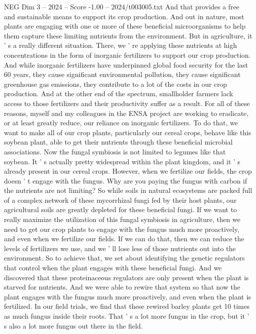 \begin{textsample}{NEG Dim 3 – 2024 – Score -1.00 – 2024/t003005.txt}
And that provides a free and sustainable means to support its crop production.
And out in nature, most plants are engaging with one or more of these beneficial microorganisms to help them capture these limiting nutrients from the environment.
But in agriculture, it ' s a really different situation.
There, we ' re applying these nutrients at high concentrations in the form of inorganic fertilizers to support our crop production.
And while inorganic fertilizers have underpinned global food security for the last 60 years, they cause significant environmental pollution, they cause significant greenhouse gas emissions, they contribute to a lot of the costs in our crop production.
And at the other end of the spectrum, smallholder farmers lack access to those fertilizers and their productivity suffer as a result.
For all of these reasons, myself and my colleagues in the ENSA project are working to eradicate, or at least greatly reduce, our reliance on inorganic fertilizers.
To do that, we want to make all of our crop plants, particularly our cereal crops, behave like this soybean plant, able to get their nutrients through these beneficial microbial associations.
Now the fungal symbiosis is not limited to legumes like that soybean.
It ' s actually pretty widespread within the plant kingdom, and it ' s already present in our cereal crops.
However, when we fertilize our fields, the crop doesn ' t engage with the fungus.
Why are you paying the fungus with carbon if the nutrients are not limiting?
So while soils in natural ecosystems are packed full of a complex network of these mycorrhizal fungi fed by their host plants, our agricultural soils are greatly depleted for these beneficial fungi.
If we want to really maximize the utilization of this fungal symbiosis in agriculture, then we need to get our crop plants to engage with the fungus much more proactively, and even when we fertilize our fields.
If we can do that, then we can reduce the levels of fertilizers we use, and we ' ll lose less of those nutrients out into the environment.
So to achieve that, we set about identifying the genetic regulators that control when the plant engages with these beneficial fungi.
And we discovered that these proteinaceous regulators are only present when the plant is starved for nutrients.
And we were able to rewire that system so that now the plant engages with the fungus much more proactively, and even when the plant is fertilized.
In our field trials, we find that these rewired barley plants get 10 times as much fungus inside their roots.
That ' s a lot more fungus in the crop, but it ' s also a lot more fungus out there in the field.

\end{textsample}
